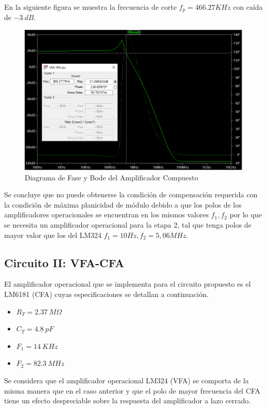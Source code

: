 En la siguiente figura se muestra la frecuencia de corte \(f_p=466.27KHz\) con caída de \(-3~dB\). 


\begin{figure}[H]
    \centering
    \includegraphics[width=0.7\linewidth]{VFA-VFA-Bode.png}
    \caption{Diagrama de Fase y Bode del Amplificador Compuesto}
    \label{fig:enter-label}
\end{figure}

Se concluye que no puede obtenerse la condición de compensación requerida con la condición de máxima planicidad de módulo debido a que los polos de los amplificadores operacionales se encuentran en los mismos valores \(f_1, f_2\) por lo que se necesita un amplificador operacional para la etapa 2, tal que tenga polos de mayor valor que los del LM324 \(f_1= 10Hz , f_2= 5,06MHz\).


\newpage
\subsection{Circuito II: VFA-CFA}
\hspace{1mm} El amplificador operacional que se implementa para el circuito propuesto es el LM6181 (CFA) cuyas especificaciones se detallan a continuación.

\begin{itemize}
    \item \(R_T=2.37~M\Omega\)
    \item \(C_T=4.8~pF\)
    \item \(F_1=14~KHz\)
    \item \(F_2=82.3~MHz\)
\end{itemize}

\bigskip
\hspace{1mm} Se considera que el amplificador operacional LM324 (VFA) se comporta de la misma manera que en el caso anterior  y que el polo de mayor frecuencia del CFA tiene un efecto despreciable sobre la respuesta del amplificador a lazo cerrado.

